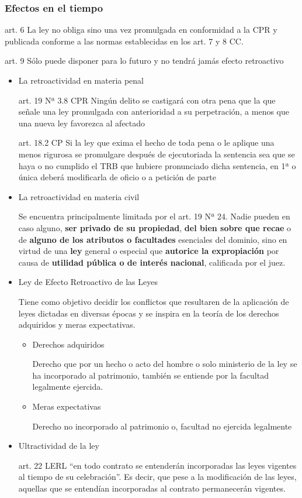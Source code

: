 \documentclass[]{article}
\begin{document}
\hypertarget{efectos-en-el-tiempo}{%
\subsubsection{Efectos en el tiempo}\label{efectos-en-el-tiempo}}

art. 6 La ley no obliga sino una vez promulgada en conformidad a la CPR
y publicada conforme a las normas establecidas en los art. 7 y 8 CC.

art. 9 Sólo puede disponer para lo futuro y no tendrá jamás efecto
retroactivo

\begin{itemize}
\item
  La retroactividad en materia penal

  art. 19 Nª 3.8 CPR Ningún delito se castigará con otra pena que la que
  señale una ley promulgada con anterioridad a su perpetración, a menos
  que una nueva ley favorezca al afectado

  art. 18.2 CP Si la ley que exima el hecho de toda pena o le aplique
  una menos rigurosa se promulgare después de ejecutoriada la sentencia
  sea que se haya o no cumplido el TRB que hubiere pronunciado dicha
  sentencia, en 1ª o única deberá modificarla de oficio o a petición de
  parte
\item
  La retroactividad en materia civil

  Se encuentra principalmente limitada por el art. 19 Nª 24. Nadie
  pueden en caso alguno, \textbf{ser privado de su propiedad},
  \textbf{del bien sobre que recae} o de \textbf{alguno de los atributos
  o facultades} esenciales del dominio, sino en virtud de una
  \textbf{ley} general o especial que \textbf{autorice la expropiación}
  por causa de \textbf{utilidad pública o de interés nacional},
  calificada por el juez.
\item
  Ley de Efecto Retroactivo de las Leyes

  Tiene como objetivo decidir los conflictos que resultaren de la
  aplicación de leyes dictadas en diversas épocas y se inspira en la
  teoría de los derechos adquiridos y meras expectativas.

  \begin{itemize}
  \item
    Derechos adquiridos

    Derecho que por un hecho o acto del hombre o solo ministerio de la
    ley se ha incorporado al patrimonio, también se entiende por la
    facultad legalmente ejercida.
  \item
    Meras expectativas

    Derecho no incorporado al patrimonio o, facultad no ejercida
    legalmente
  \end{itemize}
\item
  Ultractividad de la ley

  art. 22 LERL ``en todo contrato se entenderán incorporadas las leyes
  vigentes al tiempo de su celebración''. Es decir, que pese a la
  modificación de las leyes, aquellas que se entendían incorporadas al
  contrato permanecerán vigentes.
\end{itemize}
\end{document}
